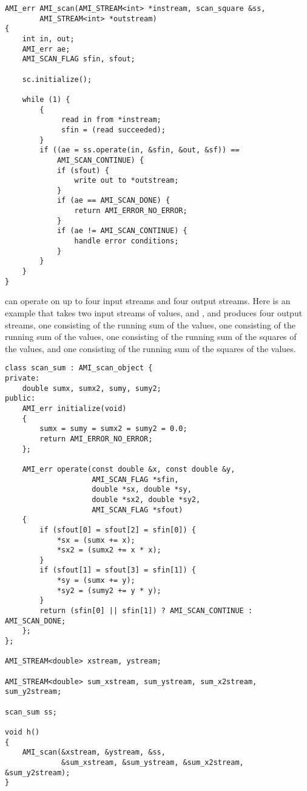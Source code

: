 \begin{verbatim} 
AMI_err AMI_scan(AMI_STREAM<int> *instream, scan_square &ss, 
        AMI_STREAM<int> *outstream)
{
    int in, out;
    AMI_err ae;    
    AMI_SCAN_FLAG sfin, sfout;

    sc.initialize();

    while (1) {
        {
             read in from *instream;
             sfin = (read succeeded);
        }
        if ((ae = ss.operate(in, &sfin, &out, &sf)) == 
            AMI_SCAN_CONTINUE) {
            if (sfout) {
                write out to *outstream;
            }
            if (ae == AMI_SCAN_DONE) {
                return AMI_ERROR_NO_ERROR;
            }
            if (ae != AMI_SCAN_CONTINUE) {
                handle error conditions;
            }
        }
    }
}
\end{verbatim}

 can operate on up
to four input streams and four output streams.  Here is an example
that takes two input streams of values,  and , and
produces four output streams, 
one consisting of the running sum of the
 values,
one consisting of the running sum of the
 values,
one consisting of the running sum of the
squares of the  values,
and
one consisting of the running sum of the
squares of the  values.

\begin{verbatim}
class scan_sum : AMI_scan_object {
private:
    double sumx, sumx2, sumy, sumy2;
public:
    AMI_err initialize(void)
    {
        sumx = sumy = sumx2 = sumy2 = 0.0;
        return AMI_ERROR_NO_ERROR;
    };

    AMI_err operate(const double &x, const double &y, 
                    AMI_SCAN_FLAG *sfin,
                    double *sx, double *sy, 
                    double *sx2, double *sy2, 
                    AMI_SCAN_FLAG *sfout)
    {
        if (sfout[0] = sfout[2] = sfin[0]) {
            *sx = (sumx += x);
            *sx2 = (sumx2 += x * x);
        }
        if (sfout[1] = sfout[3] = sfin[1]) {
            *sy = (sumx += y);
            *sy2 = (sumy2 += y * y);
        }        
        return (sfin[0] || sfin[1]) ? AMI_SCAN_CONTINUE : AMI_SCAN_DONE;
    };
};

AMI_STREAM<double> xstream, ystream;

AMI_STREAM<double> sum_xstream, sum_ystream, sum_x2stream, sum_y2stream;

scan_sum ss;

void h()
{
    AMI_scan(&xstream, &ystream, &ss, 
             &sum_xstream, &sum_ystream, &sum_x2stream, &sum_y2stream);
}
\end{verbatim}

